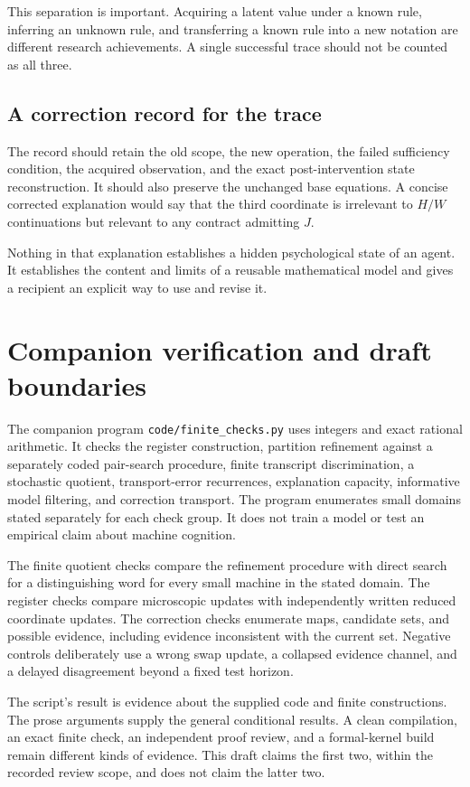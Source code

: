 \documentclass[11pt,letterpaper]{article}
\theoremstyle{plain}
\theoremstyle{definition}
\newcommand{\code}[1]{\texttt{\small #1}}
\begin{document}
This separation is important. Acquiring a latent value under a known rule, inferring an unknown rule, and transferring a known rule into a new notation are different research achievements. A single successful trace should not be counted as all three.

\subsection{A correction record for the trace}
The record should retain the old scope, the new operation, the failed sufficiency condition, the acquired observation, and the exact post-intervention state reconstruction. It should also preserve the unchanged base equations. A concise corrected explanation would say that the third coordinate is irrelevant to $H/W$ continuations but relevant to any contract admitting $J$.

Nothing in that explanation establishes a hidden psychological state of an agent. It establishes the content and limits of a reusable mathematical model and gives a recipient an explicit way to use and revise it.

\section{Companion verification and draft boundaries}\label{app:verification}
The companion program \code{code/finite\_checks.py} uses integers and exact rational arithmetic. It checks the register construction, partition refinement against a separately coded pair-search procedure, finite transcript discrimination, a stochastic quotient, transport-error recurrences, explanation capacity, informative model filtering, and correction transport. The program enumerates small domains stated separately for each check group. It does not train a model or test an empirical claim about machine cognition.

The finite quotient checks compare the refinement procedure with direct search for a distinguishing word for every small machine in the stated domain. The register checks compare microscopic updates with independently written reduced coordinate updates. The correction checks enumerate maps, candidate sets, and possible evidence, including evidence inconsistent with the current set. Negative controls deliberately use a wrong swap update, a collapsed evidence channel, and a delayed disagreement beyond a fixed test horizon.

The script's result is evidence about the supplied code and finite constructions. The prose arguments supply the general conditional results. A clean compilation, an exact finite check, an independent proof review, and a formal-kernel build remain different kinds of evidence. This draft claims the first two, within the recorded review scope, and does not claim the latter two.
\end{document}
